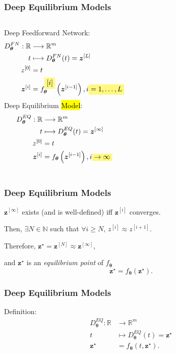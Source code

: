 \documentclass[t]{beamer}
\newcommand{\R}{\mathbb{R}}
\newcommand{\N}{\mathbb{N}}
\newcommand{\highlight}[1]{%
  \colorbox{yellow!50}{$\displaystyle#1$}}
\begin{document}
\begin{frame}
    \frametitle{Deep Equilibrium Models}
    \begin{columns}
	Deep Feedforward Network:
	\begin{align*}
	    D^{FN}_{\bm{\theta}}: \R &\longrightarrow \R^{m} \\
	    t &\longmapsto 	D^{FN}_{\bm{\theta}}(	t) = \bm{z}^{[L]} \\
	    z^{[0]} &= t \\
	    \bm{z}^{[i]} &= f^{\highlight{[i]}}_{\bm{\theta}}\left( \bm{z}^{[i-1]} \right) , i\highlight{=1,\ldots,L}
	\end{align*} \pause
	Deep Equilibrium \hl{Model}:
	\begin{align*}
	    D^{EQ}_{\bm{\theta}}: \R &\longrightarrow \R^{m} \\
	    t &\longmapsto 	D^{EQ}_{\bm{\theta}}(	t) = \bm{z}^{[\infty]} \\
	    z^{[0]} &= t \\
	    \bm{z}^{[i]} &= f_{\bm{\theta}}\left( \bm{z}^{[i-1]} \right) , i\highlight{\to \infty}
	\end{align*}
    \end{columns}
\end{frame}

\begin{frame}
    \frametitle{Deep Equilibrium Models}
    $\bm{z}^{[\infty]}$ exists (and is well-defined) iff $\bm{z}^{[i]}$ converges.
    \linebreak \pause

    Then, $\exists N\in \N$ such that $\forall i\ge N,\,z^{[i]}\approx z^{[i+1]}$.
    \linebreak \pause

    Therefore, $\bm{z}^{\star}=\bm{z}^{[N]}\approx \bm{z}^{[\infty]}$,
    \linebreak \pause

    and $\bm{z}^{\star}$ is an \emph{equilibrium point} of $f_{\bm{\theta}}$ \[
	    \bm{z}^{\star} = f_{\bm{\theta}}\left( \bm{z}^{\star} \right)
    .\] 
\end{frame}

\begin{frame}
    \frametitle{Deep Equilibrium Models}
    Definition:
    \begin{align*}
	D^{EQ}_{\bm{\theta}}: \R &\longrightarrow \R^{m} \\
	t &\longmapsto 	D^{EQ}_{\bm{\theta}}(	t) = \bm{z}^{\star} \\
	\bm{z}^{\star} &= f_{\bm{\theta}}\left( t, \bm{z}^{\star} \right)
    .\end{align*}
\end{frame}
\end{document}
